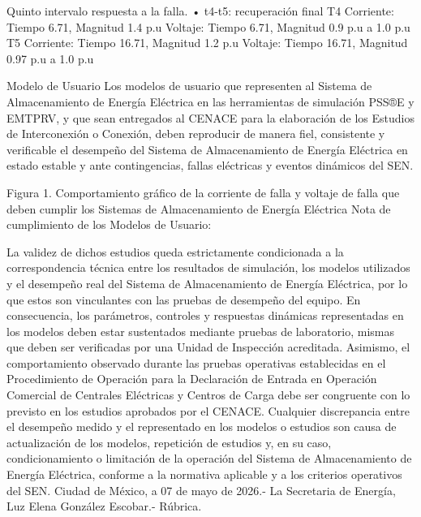  Quinto intervalo respuesta a la falla. • t4-t5: recuperación final
 T4
Corriente: Tiempo 6.71, Magnitud 1.4 p.u
Voltaje: Tiempo 6.71, Magnitud 0.9 p.u a 1.0 p.u
T5
Corriente: Tiempo 16.71, Magnitud 1.2 p.u
Voltaje: Tiempo 16.71, Magnitud 0.97 p.u a 1.0 p.u
 
 Modelo de Usuario 
 Los modelos de usuario que representen al Sistema de Almacenamiento de Energía Eléctrica en las herramientas de simulación PSS®E y EMTPRV, y que sean entregados al CENACE para la elaboración de los Estudios de Interconexión o Conexión, deben reproducir de manera fiel, consistente y verificable el desempeño del Sistema de Almacenamiento de Energía Eléctrica en estado estable y ante contingencias, fallas eléctricas y eventos dinámicos del SEN.
 
 

Figura 1. Comportamiento gráfico de la corriente de falla y voltaje de falla que deben cumplir los Sistemas de Almacenamiento de Energía Eléctrica
Nota de cumplimiento de los Modelos de Usuario:\par
La validez de dichos estudios queda estrictamente condicionada a la correspondencia técnica entre los resultados de simulación, los modelos utilizados y el desempeño real del Sistema de Almacenamiento de Energía Eléctrica, por lo que estos son vinculantes con las pruebas de desempeño del equipo. En consecuencia, los parámetros, controles y respuestas dinámicas representadas en los modelos deben estar sustentados mediante pruebas de laboratorio, mismas que deben ser verificadas por una Unidad de Inspección acreditada.
Asimismo, el comportamiento observado durante las pruebas operativas establecidas en el Procedimiento de Operación para la Declaración de Entrada en Operación Comercial de Centrales Eléctricas y Centros de Carga debe ser congruente con lo previsto en los estudios aprobados por el CENACE. Cualquier discrepancia entre el desempeño medido y el representado en los modelos o estudios son causa de actualización de los modelos, repetición de estudios y, en su caso, condicionamiento o limitación de la operación del Sistema de Almacenamiento de Energía Eléctrica, conforme a la normativa aplicable y a los criterios operativos del SEN.
Ciudad de México, a 07 de mayo de 2026.- La Secretaria de Energía, Luz Elena González Escobar.- Rúbrica.\par
\endgroup
